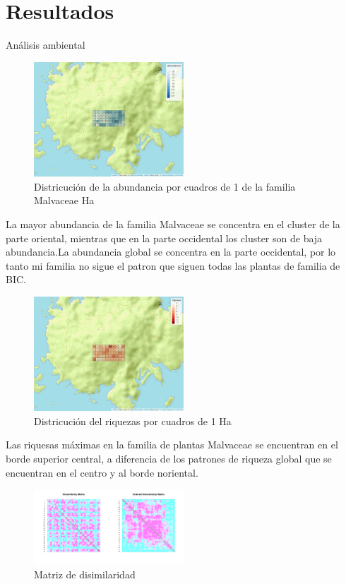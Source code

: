 \documentclass[11pt,]{article}
\begin{document}
\section{Resultados}\label{resultados}

Análisis ambiental

\begin{figure}
\centering
\includegraphics[width=0.50000\textwidth]{mapa_cuadros_abun_mi_familia.png}
\caption{Districución de la abundancia por cuadros de 1 de la familia
Malvaceae Ha}
\end{figure}

La mayor abundancia de la familia Malvaceae se concentra en el cluster
de la parte oriental, mientras que en la parte occidental los cluster
son de baja abundancia.La abundancia global se concentra en la parte
occidental, por lo tanto mi familia no sigue el patron que siguen todas
las plantas de familia de BIC.

\begin{figure}
\centering
\includegraphics[width=0.50000\textwidth]{mapa_cuadros_riq_mi_familia.png}
\caption{Districución del riquezas por cuadros de 1 Ha}
\end{figure}

Las riquesas máximas en la familia de plantas Malvaceae se encuentran en
el borde superior central, a diferencia de los patrones de riqueza
global que se encuentran en el centro y al borde noriental.

\begin{figure}
\centering
\includegraphics[width=0.50000\textwidth]{matriz_disimilaridad_hellinger.png}
\caption{Matriz de
disimilaridad\label{fig:matriz_disimilaridad_Hellinger}}
\end{figure}
\end{document}
